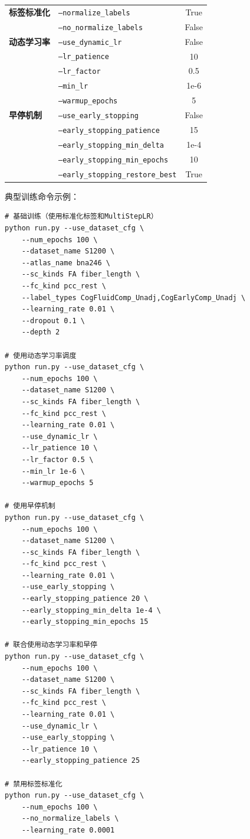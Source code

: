 \documentclass[UTF8, a4paper, 12pt]{article}
\begin{document}
\begin{table}[htbp]
\begin{tabular}{llc}
\textbf{标签标准化} & \texttt{--normalize\_labels} & True \\
 & \texttt{--no\_normalize\_labels} & False \\
\midrule
\textbf{动态学习率} & \texttt{--use\_dynamic\_lr} & False \\
 & \texttt{--lr\_patience} & 10 \\
 & \texttt{--lr\_factor} & 0.5 \\
 & \texttt{--min\_lr} & 1e-6 \\
 & \texttt{--warmup\_epochs} & 5 \\
\midrule
\textbf{早停机制} & \texttt{--use\_early\_stopping} & False \\
 & \texttt{--early\_stopping\_patience} & 15 \\
 & \texttt{--early\_stopping\_min\_delta} & 1e-4 \\
 & \texttt{--early\_stopping\_min\_epochs} & 10 \\
 & \texttt{--early\_stopping\_restore\_best} & True \\
\bottomrule
\end{tabular}
\end{table}

典型训练命令示例：

\begin{verbatim}
# 基础训练（使用标准化标签和MultiStepLR）
python run.py --use_dataset_cfg \
    --num_epochs 100 \
    --dataset_name S1200 \
    --atlas_name bna246 \
    --sc_kinds FA fiber_length \
    --fc_kind pcc_rest \
    --label_types CogFluidComp_Unadj,CogEarlyComp_Unadj \
    --learning_rate 0.01 \
    --dropout 0.1 \
    --depth 2

# 使用动态学习率调度
python run.py --use_dataset_cfg \
    --num_epochs 100 \
    --dataset_name S1200 \
    --sc_kinds FA fiber_length \
    --fc_kind pcc_rest \
    --learning_rate 0.01 \
    --use_dynamic_lr \
    --lr_patience 10 \
    --lr_factor 0.5 \
    --min_lr 1e-6 \
    --warmup_epochs 5

# 使用早停机制
python run.py --use_dataset_cfg \
    --num_epochs 100 \
    --dataset_name S1200 \
    --sc_kinds FA fiber_length \
    --fc_kind pcc_rest \
    --learning_rate 0.01 \
    --use_early_stopping \
    --early_stopping_patience 20 \
    --early_stopping_min_delta 1e-4 \
    --early_stopping_min_epochs 15

# 联合使用动态学习率和早停
python run.py --use_dataset_cfg \
    --num_epochs 100 \
    --dataset_name S1200 \
    --sc_kinds FA fiber_length \
    --fc_kind pcc_rest \
    --learning_rate 0.01 \
    --use_dynamic_lr \
    --use_early_stopping \
    --lr_patience 10 \
    --early_stopping_patience 25

# 禁用标签标准化
python run.py --use_dataset_cfg \
    --num_epochs 100 \
    --no_normalize_labels \
    --learning_rate 0.0001
\end{verbatim}
\end{document}
